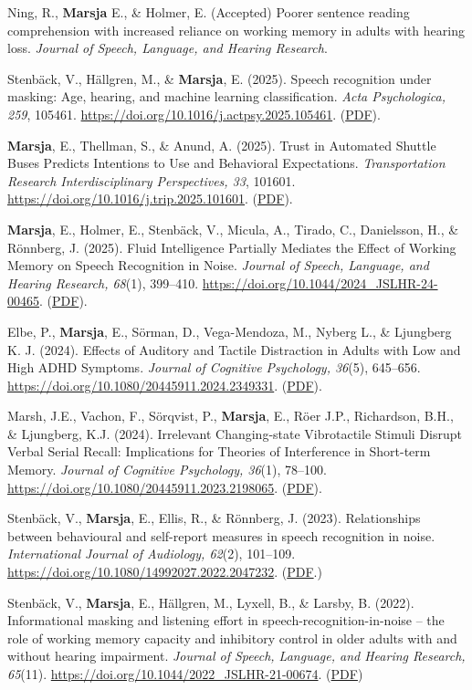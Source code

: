 \documentclass[]{article}
\begin{document}
Ning, R., \textbf{Marsja} E., \& Holmer, E. (Accepted) Poorer sentence
reading comprehension with increased reliance on working memory in
adults with hearing loss. \emph{Journal of Speech, Language, and Hearing
Research}.

Stenbäck, V., Hällgren, M., \& \textbf{Marsja}, E. (2025). Speech
recognition under masking: Age, hearing, and machine learning
classification. \emph{Acta Psychologica, 259}, 105461.
\url{https://doi.org/10.1016/j.actpsy.2025.105461}.
(\href{https://tinyurl.com/spinml}{PDF}).

\textbf{Marsja}, E., Thellman, S., \& Anund, A. (2025). Trust in
Automated Shuttle Buses Predicts Intentions to Use and Behavioral
Expectations. \emph{Transportation Research Interdisciplinary
Perspectives, 33}, 101601.
\url{https://doi.org/10.1016/j.trip.2025.101601}.
(\href{https://tinyurl.com/trusttrip}{PDF}).

\textbf{Marsja}, E., Holmer, E., Stenbäck, V., Micula, A., Tirado, C.,
Danielsson, H., \& Rönnberg, J. (2025). Fluid Intelligence Partially
Mediates the Effect of Working Memory on Speech Recognition in Noise.
\emph{Journal of Speech, Language, and Hearing Research, 68}(1),
399--410. \url{https://doi.org/10.1044/2024_JSLHR-24-00465}.
(\href{https://tinyurl.com/gfspin}{PDF}).

Elbe, P., \textbf{Marsja}, E., Sörman, D., Vega-Mendoza, M., Nyberg L.,
\& Ljungberg K. J. (2024). Effects of Auditory and Tactile Distraction
in Adults with Low and High ADHD Symptoms. \emph{Journal of Cognitive
Psychology, 36}(5), 645--656.
\url{https://doi.org/10.1080/20445911.2024.2349331}.
(\href{https://tinyurl.com/elbevibra}{PDF}).

Marsh, J.E., Vachon, F., Sörqvist, P., \textbf{Marsja}, E., Röer J.P.,
Richardson, B.H., \& Ljungberg, K.J. (2024). Irrelevant Changing-state
Vibrotactile Stimuli Disrupt Verbal Serial Recall: Implications for
Theories of Interference in Short-term Memory. \emph{Journal of
Cognitive Psychology, 36}(1), 78--100.
\url{https://doi.org/10.1080/20445911.2023.2198065}.
(\href{https://tinyurl.com/vibradistr}{PDF}).

Stenbäck, V., \textbf{Marsja}, E., Ellis, R., \& Rönnberg, J. (2023).
Relationships between behavioural and self-report measures in speech
recognition in noise. \emph{International Journal of Audiology, 62}(2),
101--109. \url{https://doi.org/10.1080/14992027.2022.2047232}.
(\href{https://tinyurl.com/IJA22}{PDF}.)

Stenbäck, V., \textbf{Marsja}, E., Hällgren, M., Lyxell, B., \& Larsby,
B. (2022). Informational masking and listening effort in
speech-recognition-in-noise -- the role of working memory capacity and
inhibitory control in older adults with and without hearing impairment.
\emph{Journal of Speech, Language, and Hearing Research, 65}(11).
\url{https://doi.org/10.1044/2022_JSLHR-21-00674}.
(\href{https://tinyurl.com/SPIN22b}{PDF})
\end{document}
